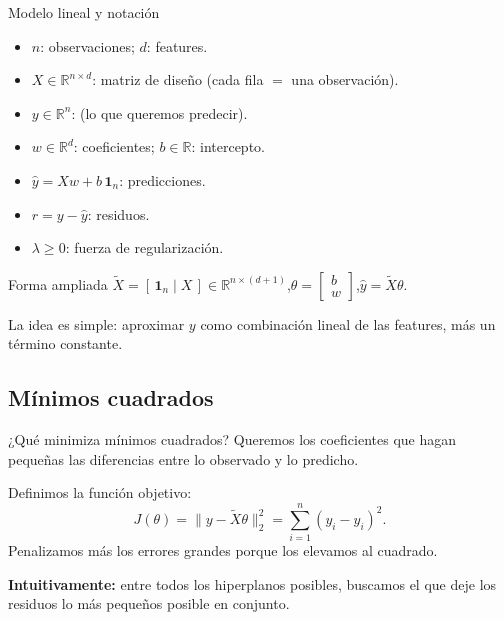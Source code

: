 \begin{frame}{Modelo lineal y notación}
\begin{itemize}\small
  \item $n$: observaciones; \; $d$: features.
  \item $X\in\mathbb{R}^{n\times d}$: matriz de diseño (cada fila $=$ una observación).
  \item $y\in\mathbb{R}^n$:  (lo que queremos predecir).
  \item $w\in\mathbb{R}^d$: coeficientes; \; $b\in\mathbb{R}$: intercepto.
  \item $\hat y = Xw + b\,\mathbf{1}_n$: predicciones.
  \item $r = y-\hat y$: residuos.
  \item $\lambda\ge 0$: fuerza de regularización.
\end{itemize}
\vspace{0.25em}
\begin{block}{Forma ampliada}
\centering
$\tilde X=[\,\mathbf{1}_n \mid X\,]\in\mathbb{R}^{n\times(d+1)}$,\quad $\theta=\begin{bmatrix}b\\ w\end{bmatrix}$,\quad $\hat y=\tilde X\theta$.
\end{block}
{\footnotesize La idea es simple: aproximar $y$ como combinación lineal de las features, más un término constante.}
\end{frame}

\subsection{Mínimos cuadrados}

\begin{frame}{¿Qué minimiza mínimos cuadrados?}
Queremos los coeficientes que hagan pequeñas las diferencias entre lo observado y lo predicho.

\vspace{0.3em}
Definimos la función objetivo:
\[
J(\theta)=\|y-\tilde X\theta\|_2^2 = \sum_{i=1}^n (y_i - \hat y_i)^2.
\]
Penalizamos más los errores grandes porque los elevamos al cuadrado.

\vspace{0.3em}
\textbf{Intuitivamente:} entre todos los hiperplanos posibles, buscamos el que deje los residuos lo más pequeños posible en conjunto.
\end{frame}

